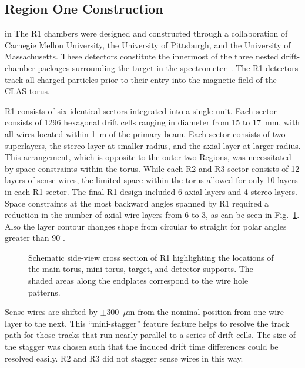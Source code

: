 \subsection{Region One Construction}

 in 
The R1 chambers were designed and constructed through a collaboration 
of Carnegie Mellon University, the University of Pittsburgh, and the 
University of Massachusetts.  These detectors constitute the innermost of 
the three nested drift-chamber packages surrounding the target in the 
spectrometer~\cite{dscnim}.  The R1 detectors track all charged particles 
prior to their entry into the magnetic field of the CLAS torus.

R1 consists of six identical sectors integrated into a single unit.  Each
sector consists of 1296 hexagonal drift cells ranging in diameter from 15 to 
17~mm, with all wires located within 1~m of the primary beam.  Each sector 
consists of two superlayers, the stereo layer at smaller radius, and the axial 
layer at larger radius.  This arrangement, which is opposite to the outer two 
Regions, was necessitated by space constraints within the torus.  While each R2 
and R3 sector consists of 12 layers of sense wires, the limited space within the 
torus allowed for only 10 layers in each R1 sector.  The final R1 design included 
6 axial layers and 4 stereo layers.  Space constraints at the most backward 
angles spanned by R1 required a reduction in the number of axial wire layers 
from 6 to 3, as can be seen in Fig.~\ref{region1}.  Also the layer contour changes 
shape from circular to straight for polar angles greater than 90$^{\circ}$.

\begin{figure}[htpb]   
\vspace{7.0cm}
\caption{\small{Schematic side-view cross section of R1 highlighting the 
locations of the main torus, mini-torus, target, and detector supports.  
The shaded areas along the endplates correspond to the wire hole patterns.}}
\label{region1}
\end{figure}   

Sense wires are shifted by $\pm$300~$\mu$m from the nominal position from one 
wire layer to the next.  This ``mini-stagger'' feature feature helps to resolve 
the track path for those tracks that run nearly parallel to a series of drift 
cells.  The size of the stagger was chosen such that the induced drift time 
differences could be resolved easily.  R2 and R3 did not stagger sense wires 
in this way.

